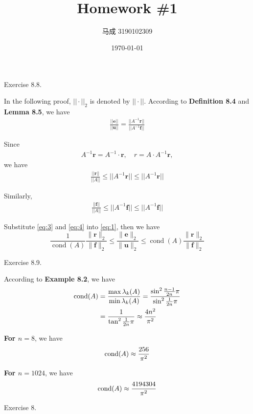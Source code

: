 \documentclass{homework}
\author{马成 3190102309}
\date{\today}
\title{Homework \#1}
\begin{document}
 \maketitle

\question Exercise 8.8.

	In the following proof, $||\cdot||_2$ is denoted by $||\cdot||$. According to \textbf{Definition 8.4} and \textbf{Lemma 8.5}, we have
	\begin{eqnarray}\label{eq:1}
		\frac{||\textbf{e}||}{||\textbf{u}||} = \frac{||A^{-1} \textbf{r}||}{||A^{-1} \textbf{f}||}
	\end{eqnarray}
	
	Since
	\begin{eqnarray}\label{eq:2}
		A^{-1} \textbf{r} = A^{-1} \cdot \textbf{r},\quad r = A \cdot A^{-1}\textbf{r},
	\end{eqnarray}
	we have
	\begin{eqnarray}\label{eq:3}
		\frac{||\textbf{r}||}{||A||} \leq ||A^{-1}\textbf{r}|| \leq ||A^{-1} \textbf{r}||
	\end{eqnarray}
	
	Similarly,
	\begin{eqnarray}\label{eq:4}
		\frac{||\textbf{f}||}{||A||} \leq ||A^{-1}\textbf{f}|| \leq ||A^{-1} \textbf{f}||
	\end{eqnarray}
	
	Substitute \ref{eq:3} and \ref{eq:4} into \ref{eq:1}, then we have 
	\begin{equation}
		\frac{1}{\operatorname{cond}(A)} \frac{\|\mathbf{r}\|_{2}}{\|\mathbf{f}\|_{2}} \leq \frac{\|\mathbf{e}\|_{2}}{\|\mathbf{u}\|_{2}} \leq \operatorname{cond}(A) \frac{\|\mathbf{r}\|_{2}}{\|\mathbf{f}\|_{2}}
	\end{equation}

\question Exercise 8.9.

	According to \textbf{Example 8.2}, we have
	\begin{eqnarray}
		\begin{aligned}
			\text{cond}(A) &= \frac{\max \lambda_k(A)}{\min \lambda_k(A)} = \frac{\sin^2 \frac{n-1}{2n}\pi}{\sin^2 \frac{1}{2n}\pi} \\
			&= \frac{1}{\tan^2 \frac{1}{2n} \pi } \approx \frac{4n^2}{\pi^2}
		\end{aligned}
	\end{eqnarray}

	\textbf{For $n = 8$}, we have
	\begin{eqnarray}
		\text{cond}(A) \approx \frac{256}{\pi^2}
	\end{eqnarray}
	
	\textbf{For $n = 1024$}, we have
	\begin{eqnarray}
		\text{cond}(A) \approx \frac{4194304}{\pi^2}
	\end{eqnarray}
	
\question Exercise 8.
\end{document}
